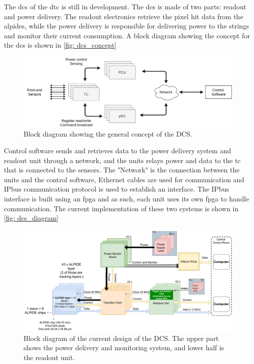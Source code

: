 \documentclass[main.tex]{subfiles}
\begin{document}
The \gls{dcs} of the \gls{dtc} is still in development. The \gls{dcs} is made of two parts: readout and power delivery. The readout electronics retrieve the pixel hit data from the \gls{alpide}s, while the power delivery is responsible for delivering power to the strings and monitor their current consumption. A block diagram showing the concept for the \gls{dcs} is shown in \autoref{fig: dcs_concept}

\begin{figure}[!ht]
    \centering
    \includegraphics[width=15cm]{images/dcs_concept.png}
    \caption{Block diagram showing the general concept of the DCS.}
    \label{fig: dcs_concept}
\end{figure}
\FloatBarrier

Control software sends and retrieves data to the power delivery system and readout unit through a network, and the units relays power and data to the \gls{tc} that is connected to the sensors. The "Network" is the connection between the units and the control software, Ethernet cables are used for communication and IPbus communication protocol is used to establish an interface. The IPbus interface is built using an \gls{fpga} and as such, each unit uses its own \gls{fpga} to handle communication. The current implementation of these two systems is shown in \autoref{fig: dcs_diagram}

\begin{figure}[!ht]
    \centering
    \includegraphics[scale=0.4]{images/pCT_Current_layout-CurrentSystemOverview.pdf}
    \caption{Block diagram of the current design of the DCS. The upper part shows the power delivery and monitoring system, and lower half is the readout unit.}
    \label{fig: dcs_diagram}
\end{figure}
\FloatBarrier
\end{document}
